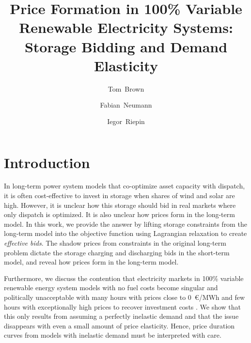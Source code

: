 \documentclass[final,3p]{elsarticle}
\begin{document}
\begin{frontmatter}

	\title{Price Formation in 100\% Variable Renewable Electricity Systems:\\Storage Bidding and Demand Elasticity}
  
	\author[tub]{Tom~Brown}
	\author[tub]{Fabian~Neumann}
	\author[tub]{Iegor~Riepin}
  
	\address[tub]{Department of Digital Transformation in Energy Systems, Institute of Energy Technology, Technische Universität Berlin (TUB), Einsteinufer 25 (TA 8), 10587, Berlin, Germany}
  

  \end{frontmatter}

\section*{Introduction}

In long-term power system models that co-optimize asset capacity with dispatch,
it is often cost-effective to invest in storage when shares of wind and solar
are high. However, it is unclear how this storage should bid in real markets
where only dispatch is optimized. It is also unclear how prices form in the
long-term model. In this work, we provide the answer by lifting storage
constraints from the long-term model into the objective function using
Lagrangian relaxation to create \textit{effective bids}. The shadow prices from
constraints in the original long-term problem dictate the storage charging and
discharging bids in the short-term model, and reveal how prices form in the
long-term model.

Furthermore, we discuss the contention that electricity markets in 100\%
variable renewable energy system models with no fuel costs become singular and
politically unacceptable with many hours with prices close to 0~\euro/MWh and
few hours with exceptionally high prices to recover investment costs
\cite{jungePropertiesDeeply2022}. We show that this only results from assuming a
perfectly inelastic demand and that the issue disappears with even a small
amount of price elasticity. Hence, price duration curves from models with
inelastic demand must be interpreted with care.
\end{document}

